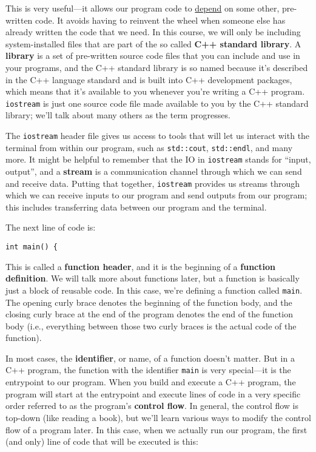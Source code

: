 \documentclass{article}
\begin{document}
This is very useful---it allows our program code to \ul{depend} on some other, pre-written code. It avoids having to reinvent the wheel when someone else has already written the code that we need. In this course, we will only be including system-installed files that are part of the so called \textbf{C++ standard library}. A \textbf{library} is a set of pre-written source code files that you can include and use in your programs, and the C++ standard library is so named because it's described in the C++ language standard and is built into C++ development packages, which means that it's available to you whenever you're writing a C++ program. \texttt{iostream} is just one source code file made available to you by the C++ standard library; we'll talk about many others as the term progresses.

The \texttt{iostream} header file gives us access to tools that will let us interact with the terminal from within our program, such as \texttt{std::cout}, \texttt{std::endl}, and many more. It might be helpful to remember that the IO in \texttt{iostream} stands for ``input, output'', and a \textbf{stream} is a communication channel through which we can send and receive data. Putting that together, \texttt{iostream} provides us streams through which we can receive inputs to our program and send outputs from our program; this includes transferring data between our program and the terminal.

The next line of code is:

\begin{verbatim}
int main() {
\end{verbatim}

This is called a \textbf{function header}, and it is the beginning of a \textbf{function definition}. We will talk more about functions later, but a function is basically just a block of reusable code. In this case, we're defining a function called \texttt{main}. The opening curly brace denotes the beginning of the function body, and the closing curly brace at the end of the program denotes the end of the function body (i.e., everything between those two curly braces is the actual code of the function).

In most cases, the \textbf{identifier}, or name, of a function doesn't matter. But in a C++ program, the function with the identifier \texttt{main} is very special---it is the entrypoint to our program. When you build and execute a C++ program, the program will start at the entrypoint and execute lines of code in a very specific order referred to as the program's \textbf{control flow}. In general, the control flow is top-down (like reading a book), but we'll learn various ways to modify the control flow of a program later. In this case, when we actually run our program, the first (and only) line of code that will be executed is this:
\end{document}
